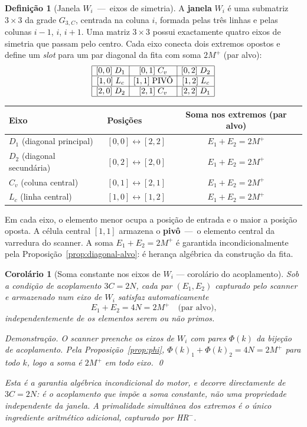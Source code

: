 \documentclass[12pt, a4paper]{article}
\theoremstyle{plain}
\newtheorem{corollary}[theorem]{Corolário}
\theoremstyle{definition}
\newtheorem{definition}[theorem]{Definição}
\theoremstyle{remark}
\begin{document}
	\begin{definition}[Janela $W_i$~---~eixos de simetria]
		\label{def:Wi}
		A \textbf{janela} $W_i$ é uma submatriz $3\times3$ da grade
		$G_{3,C}$, centrada na coluna $i$, formada pelas três linhas e
		pelas colunas $i-1$, $i$, $i+1$.  Uma matriz $3\times3$ possui
		exactamente quatro eixos de simetria que passam pelo centro.
		Cada eixo conecta dois extremos opostos e define um
		\emph{slot} para um par diagonal da fita com soma $2M^+$ (par
		alvo):
		\[
		\begin{array}{|c|c|c|}
			\hline
			[0,0]\;D_1 & [0,1]\;C_v & [0,2]\;D_2\\
			\hline
			[1,0]\;L_c & [1,1]\;\text{PIVÔ} & [1,2]\;L_c\\
			\hline
			[2,0]\;D_2 & [2,1]\;C_v & [2,2]\;D_1\\
			\hline
		\end{array}
		\]
		\begin{center}
			\begin{tabular}{llc}
				\toprule
				Eixo & Posições & Soma nos extremos (par alvo)\\
				\midrule
				$D_1$ (diagonal principal)  &
				$[0,0]\leftrightarrow[2,2]$ & $E_1+E_2=2M^+$\\
				$D_2$ (diagonal secundária) &
				$[0,2]\leftrightarrow[2,0]$ & $E_1+E_2=2M^+$\\
				$C_v$ (coluna central)      &
				$[0,1]\leftrightarrow[2,1]$ & $E_1+E_2=2M^+$\\
				$L_c$ (linha central)       &
				$[1,0]\leftrightarrow[1,2]$ & $E_1+E_2=2M^+$\\
				\bottomrule
			\end{tabular}
		\end{center}
		Em cada eixo, o elemento menor ocupa a posição de entrada e o
		maior a posição oposta.  A célula central $[1,1]$ armazena o
		\textbf{pivô}~---~o elemento central da varredura do scanner.
		A soma $E_1+E_2=2M^+$ é garantida incondicionalmente pela
		Proposição~\ref{prop:diagonal-alvo}: é herança algébrica da
		construção da fita.
	\end{definition}
	
	\begin{corollary}[Soma constante nos eixos de $W_i$ --- corolário do acoplamento]
		\label{prop:soma-Wi}
		Sob a condição de acoplamento $3C=2N$, cada par $(E_1,E_2)$
		capturado pelo scanner e armazenado num eixo de $W_i$ satisfaz
		automaticamente
		\[
		E_1+E_2=4N=2M^+\quad\text{(par alvo),}
		\]
		independentemente de os elementos serem ou não primos.
		
		\medskip\noindent\textit{Demonstração.}
		O scanner preenche os eixos de $W_i$ com pares $\Phi(k)$ da
		bijeção de acoplamento.  Pela Proposição~\ref{prop:phi},
		$\Phi(k)_1+\Phi(k)_2=4N=2M^+$ para todo $k$, logo a soma
		é $2M^+$ em todo eixo. \qed
		
		\medskip\noindent
		Esta é a garantia algébrica incondicional do motor, e decorre
		directamente de $3C=2N$: é o acoplamento que impõe a soma
		constante, não uma propriedade independente da janela.
		A primalidade simultânea dos extremos é o único ingrediente
		aritmético adicional, capturado por HR$^-$.
	\end{corollary}
	
\end{document}
